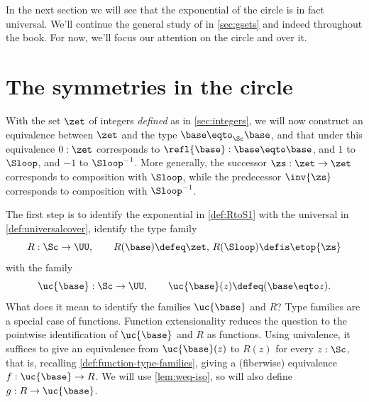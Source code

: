 In the next section we will see that the exponential \covering
of the circle is in fact universal.
We'll continue the general study of \coverings in \cref{sec:gsets}
and indeed throughout the book.
For now, we'll focus our attention on the circle and \coverings over it.

\section{The symmetries in the circle}
\label{sec:symcirc}

With the set $\zet$ of integers \emph{defined} as in \cref{sec:integers},
we will now construct an equivalence between $\zet$ and the type
$\base\eqto_{\Sc}\base$, and that under this equivalence $0:\zet$ corresponds to
$\refl{\base}:\base\eqto \base$, and $1$ to $\Sloop$, and $-1$ to $\Sloop^{-1}$.
More generally, the successor $\zs:\zet\to\zet$ corresponds to composition
with $\Sloop$, while the predecessor $\inv{\zs}$ corresponds to composition
with $\Sloop^{-1}$.

The first step is to identify the exponential \covering in \cref{def:RtoS1}
with the universal \covering in \cref{def:universalcover},
\ie identify the type family
\[
  R: \Sc\to\UU,\qquad R(\base)\defeq\zet,\, R(\Sloop)\defis \etop{\zs}
\]
with the family
\[
\uc{\base}:\Sc\to\UU,\qquad \uc{\base}(z)\defeq (\base\eqto z).
\]
What does it mean to identify the families $\uc{\base}$ and $R$?
Type families are a special case of functions.
Function extensionality reduces the question to the pointwise
identification of $\uc{\base}$ and $R$ as functions.
Using univalence, it suffices to give
an equivalence from $\uc{\base}(z)$ to $R(z)$ for every $z:\Sc$,
that is, recalling \cref{def:function-type-families}, giving
a (fiberwise) equivalence $f: \uc{\base}\to R$. We will use
\cref{lem:weq-iso}, so will also define $g: R\to\uc{\base}$.

